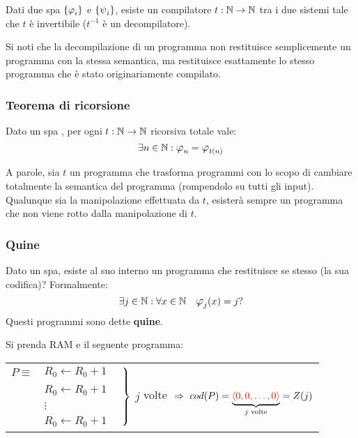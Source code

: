 \begin{theorem}
    Dati due spa $\sistProg$ e $\sistProgW$, esiste un compilatore $t:\mathbb{N}\to\mathbb{N}$ tra
    i due sistemi tale che $t$ è invertibile ($t^{-1}$ è un decompilatore).
\end{theorem}

Si noti che la decompilazione di un programma non restituisce semplicemente un
programma con la stessa semantica, ma restituisce esattamente lo stesso programma
che è stato originariamente compilato.

\subsubsection{Teorema di ricorsione}
\begin{theorem}\label{theo:ric}
    Dato un spa \sistProg, per ogni $t:\mathbb{N}\to\mathbb{N}$ ricorsiva totale vale:
    $$ \exists n\in\N:\semanticaRAM_n=\semanticaRAM_{t(n)} $$
\end{theorem}

A parole, sia $t$ un programma che trasforma programmi con lo scopo di cambiare
totalmente la semantica del programma (rompendolo su tutti gli input). Qualunque
sia la manipolazione effettuata da $t$, esisterà sempre un programma che non 
viene rotto dalla manipolazione di $t$.

\subsubsection*{Quine}
Dato un spa, esiste al suo interno un programma che restituisce se stesso (la
sua codifica)?
Formalmente:
$$ \exists j\in\N: \forall x\in\N \quad \semanticaRAM_j(x)=j ?$$
Questi programmi sono dette \textbf{quine}.

Si prenda RAM e il seguente programma:

\begin{center}
    \begin{tabular}{r l l}
        $P\equiv$ & $R_0 \leftarrow R_0+1$  & 
        \multirow{4}{*}{\hspace{-1em}
            $\begin{rcases}
                \phantom{}\\
                \phantom{}\\
                \phantom{\vdots}\\
                \phantom{}\\
            \end{rcases}$ $j$ volte $\ \Rightarrow \ cod(P)=
            \underbrace{\color{red}\langle0,0,\dots,0\rangle}_{\text{$j$ volte}}
            = Z(j)$
        }\\
        & $R_0 \leftarrow R_0+1$  \\ 
        & \hspace{2em}$\vdots$    \\
        & $R_0 \leftarrow R_0+1$  \\                     
    \end{tabular}
\end{center}

